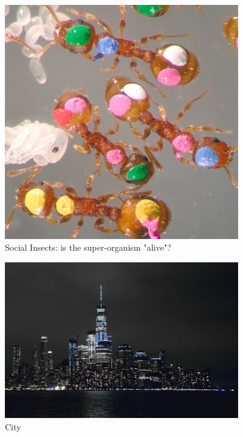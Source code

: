 \documentclass[]{article}
\begin{document}
\begin{figure}[H]
	\caption{Social Insects: is the super-organism "alive"?}\label{fig:social:insects}
	\includegraphics[width=0.9\textwidth]{SocialInsects}
\end{figure}

\begin{figure}[H]
	\caption{City}\label{fig:city}
	\includegraphics[width=0.9\textwidth]{City}
\end{figure}
\end{document}
